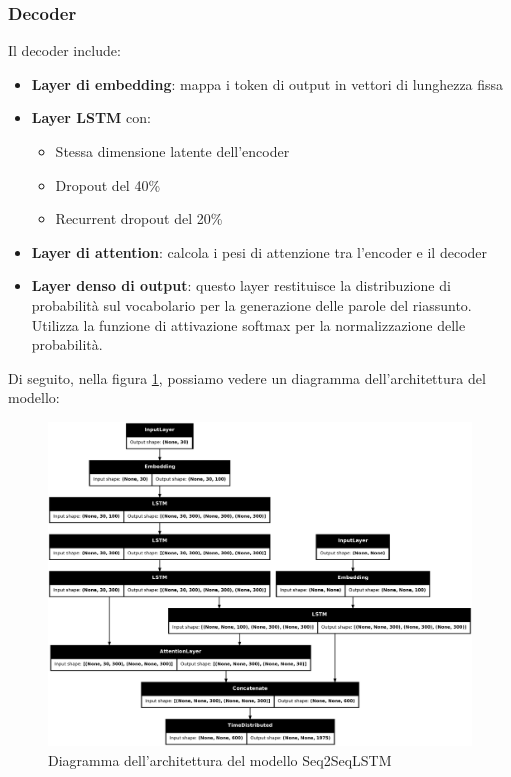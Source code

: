 \documentclass[a4paper, 12pt]{article}
\begin{document}
\subsubsection{Decoder}
Il decoder include:
\begin{itemize}
    \item \textbf{Layer di embedding}: mappa i token di output in vettori di lunghezza fissa
    \item \textbf{Layer LSTM} con:
        \begin{itemize}
            \item Stessa dimensione latente dell'encoder
            \item Dropout del 40\%
            \item Recurrent dropout del 20\%
        \end{itemize}
    \item \textbf{Layer di attention}: calcola i pesi di attenzione tra l'encoder e il decoder
    \item \textbf{Layer denso di output}: questo layer restituisce la distribuzione di probabilità sul vocabolario per la generazione delle parole del riassunto.\\ 
    Utilizza la funzione di attivazione softmax per la normalizzazione delle probabilità.
\end{itemize}

Di seguito, nella figura \ref{fig:seq2seqlstm_model_architecture}, possiamo vedere un diagramma dell'architettura del modello:

\begin{figure}[H]
    \centering
    \includegraphics[width=1\textwidth]{media/Seq2SeqLSTM_originale_image.png}
    \caption{Diagramma dell'architettura del modello Seq2SeqLSTM}
    \label{fig:seq2seqlstm_model_architecture}
\end{figure}
\end{document}
